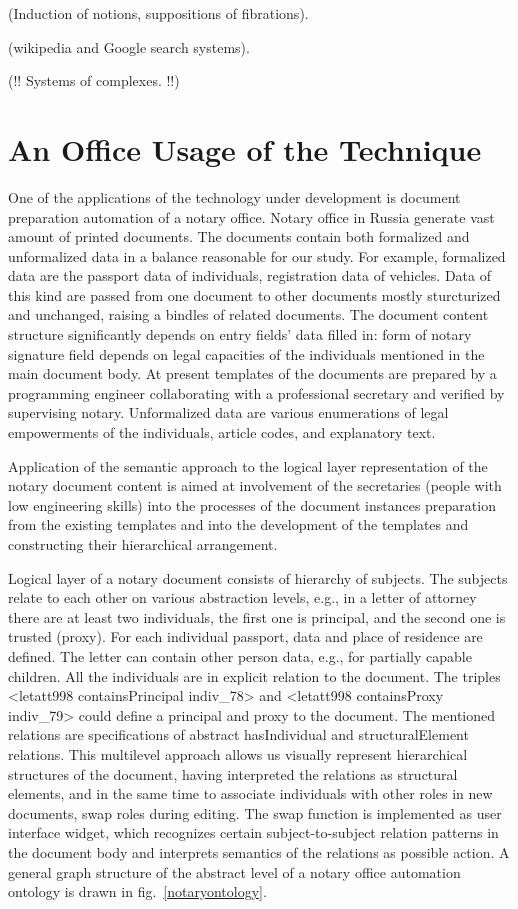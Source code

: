 \documentclass[conference]{IEEEtran}
\begin{document}
(Induction of notions, suppositions of fibrations).

(wikipedia and Google search systems).

(!! Systems of complexes. !!)

\section{An Office Usage of the Technique}

One of the applications of the technology under development is document preparation automation of a notary office. Notary office in Russia generate vast amount of printed documents. The documents contain both formalized and unformalized data in a balance reasonable for our study. For example, formalized data are the passport data of individuals, registration data of vehicles. Data of this kind are passed from one document to other documents mostly sturcturized and unchanged, raising a bindles of related documents. The document content structure significantly depends on entry fields’ data filled in: form of notary signature field depends on legal capacities of the individuals mentioned in the main document body. At present templates of the documents are prepared by a programming engineer collaborating with a professional secretary and verified by supervising notary. Unformalized data are various enumerations of legal empowerments of the individuals, article codes, and explanatory text.

Application of the semantic approach to the logical layer representation of the notary document content is aimed at involvement of the secretaries (people with low engineering skills) into the processes of the document instances preparation from the existing templates and into the development of the templates and constructing their hierarchical arrangement.

Logical layer of a notary document consists of hierarchy of subjects. The subjects relate to each other on various abstraction levels, e.g., in a letter of attorney there are at least two individuals, the first one is principal, and the second one is trusted (proxy). For each individual passport, data and place of residence are defined. The letter can contain other person data, e.g., for partially capable children. All the individuals are in explicit relation to the document. The triples <letatt998 containsPrincipal indiv\_78> and <letatt998 containsProxy indiv\_79> could define a principal and proxy to the document. The mentioned relations are specifications of abstract hasIndividual and structuralElement relations. This multilevel approach allows us visually represent hierarchical structures of the document, having interpreted the relations as structural elements, and in the same time to associate individuals with other roles in new documents, swap roles during editing. The swap function is implemented as user interface widget, which recognizes certain subject-to-subject relation patterns in the document body and interprets semantics of the relations as possible action. A general graph structure of the abstract level of a notary office automation ontology is drawn in fig.~\ref{notaryontology}.
\end{document}
